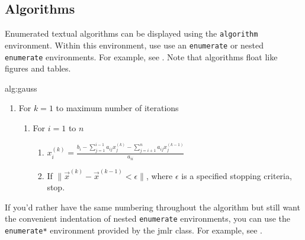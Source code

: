\documentclass[mlmain]{jmlr}
\begin{document}
\subsection{Algorithms}
\label{sec:algorithms}

Enumerated textual algorithms can be displayed using the
\texttt{algorithm} environment. Within this environment, use
use an \texttt{enumerate} or nested \texttt{enumerate} environments.
For example, see . Note that algorithms
float like figures and tables.

\begin{algorithm}[htbp]
\floatconts
{alg:gauss}%
{\caption{The Gauss-Seidel Algorithm}}
{%
\begin{enumerate}
  \item For $k=1$ to maximum number of iterations
    \begin{enumerate}
      \item For $i=1$ to $n$
        \begin{enumerate}
        \item $x_i^{(k)} = 
          \frac{b_i - \sum_{j=1}^{i-1}a_{ij}x_j^{(k)}
          - \sum_{j=i+1}^{n}a_{ij}x_j^{(k-1)}}{a_{ii}}$
        \item If $\|\vec{x}^{(k)}-\vec{x}^{(k-1)} < \epsilon\|$,
          where $\epsilon$ is a specified stopping criteria, stop.
      \end{enumerate}
    \end{enumerate}
\end{enumerate}
}
\end{algorithm}

If you'd rather have the same numbering throughout the algorithm
but still want the convenient indentation of nested 
\texttt{enumerate} environments, you can use the
\texttt{enumerate*} environment provided by the \textsf{jmlr}
class. For example, see .
\end{document}

